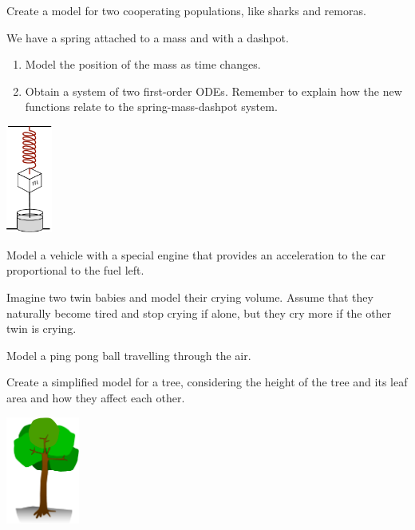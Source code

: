 \begin{exercises}

	\begin{problist}
	
	\prob Create a model for two cooperating populations, like sharks and remoras. 
	
	
	
	
	\begin{minipage}{.35\textwidth}
		\prob We have a spring attached to a mass and with a dashpot. 
		\begin{enumerate}
			\item Model the position of the mass as time changes.
			\item Obtain a system of two first-order ODEs. Remember to explain how the new functions relate to the spring-mass-dashpot system.
		\end{enumerate}
	\end{minipage}
	\hfill
	\begin{minipage}{100pt}
		\includegraphics*[height=100pt]{images/module16-spring-mass-dashpot.pdf}
	\end{minipage}

	\prob Model a vehicle with a special engine that provides an acceleration to the car proportional to the fuel left.
	
	\prob Imagine two twin babies and model their crying volume. Assume that they naturally become tired and stop crying if alone, but they cry more if the other twin is crying.
	
	\prob Model a ping pong ball travelling through the air.
	
	\begin{minipage}{.35\textwidth}
		\prob Create a simplified model for a tree, considering the height of the tree and its leaf area and how they affect each other.	
	\end{minipage}
	\hfill
	\begin{minipage}{100pt}
		\includegraphics*[height=100pt]{images/module16-tree.pdf}
	\end{minipage}


\end{problist}
\end{exercises}
